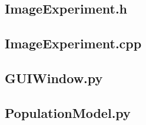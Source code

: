 \documentclass[a4paper,10pt]{article}
\begin{document}
%

\subsection{ImageExperiment.h}


\subsection{ImageExperiment.cpp}


\subsection{GUIWindow.py}


\subsection{PopulationModel.py}

\end{document}
